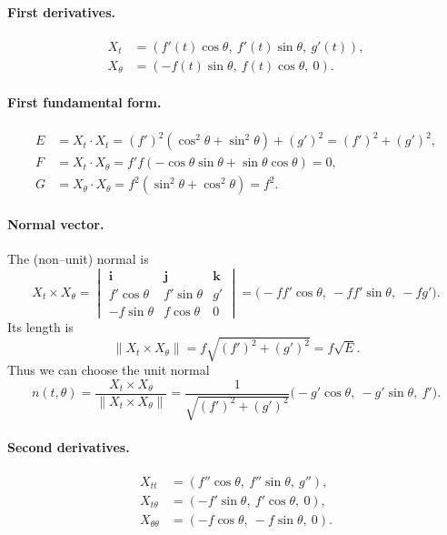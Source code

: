 \documentclass[12pt,a4paper]{article}
\theoremstyle{plain}
\theoremstyle{definition}      %
\begin{document}
\paragraph{First derivatives.}
\[
\begin{aligned}
	X_t &= (f'(t)\cos\theta,\ f'(t)\sin\theta,\ g'(t)),\\[1mm]
	X_\theta &= (-f(t)\sin\theta,\ f(t)\cos\theta,\ 0).
\end{aligned}
\]

\paragraph{First fundamental form.}
\[
\begin{aligned}
	E &= X_t\cdot X_t
	= (f')^2(\cos^2\theta+\sin^2\theta) + (g')^2
	= (f')^2+(g')^2,\\[1mm]
	F &= X_t\cdot X_\theta
	= f'f(-\cos\theta\sin\theta+\sin\theta\cos\theta)=0,\\[1mm]
	G &= X_\theta\cdot X_\theta
	= f^2(\sin^2\theta+\cos^2\theta)=f^2.
\end{aligned}
\]

\paragraph{Normal vector.}
The (non–unit) normal is
\[
X_t\times X_\theta
= \begin{vmatrix}
	\mathbf{i} & \mathbf{j} & \mathbf{k} \\
	f'\cos\theta & f'\sin\theta & g'\\
	-f\sin\theta & f\cos\theta & 0
\end{vmatrix}
= \bigl(-ff'\cos\theta,\ -ff'\sin\theta,\ -fg'\bigr).
\]
Its length is
\[
\|X_t\times X_\theta\|
= f\sqrt{(f')^2+(g')^2} = f\sqrt{E}.
\]
Thus we can choose the unit normal
\[
n(t,\theta)
= \frac{X_t\times X_\theta}{\|X_t\times X_\theta\|}
= \frac{1}{\sqrt{(f')^2+(g')^2}}
\bigl(-g'\cos\theta,\ -g'\sin\theta,\ f'\bigr).
\]

\paragraph{Second derivatives.}
\[
\begin{aligned}
	X_{tt} &= (f''\cos\theta,\ f''\sin\theta,\ g''),\\[1mm]
	X_{t\theta} &= (-f'\sin\theta,\ f'\cos\theta,\ 0),\\[1mm]
	X_{\theta\theta} &= (-f\cos\theta,\ -f\sin\theta,\ 0).
\end{aligned}
\]
\end{document}
